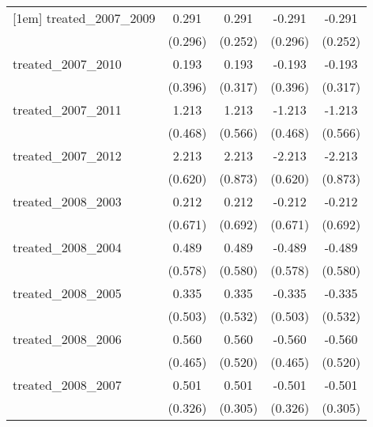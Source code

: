 {\begin{tabular}{l*{4}{c}}
[1em]
treated\_2007\_2009&       0.291         &       0.291         &      -0.291         &      -0.291         \\
            &     (0.296)         &     (0.252)         &     (0.296)         &     (0.252)         \\
[1em]
treated\_2007\_2010&       0.193         &       0.193         &      -0.193         &      -0.193         \\
            &     (0.396)         &     (0.317)         &     (0.396)         &     (0.317)         \\
[1em]
treated\_2007\_2011&       1.213\sym{**} &       1.213\sym{*}  &      -1.213\sym{**} &      -1.213\sym{*}  \\
            &     (0.468)         &     (0.566)         &     (0.468)         &     (0.566)         \\
[1em]
treated\_2007\_2012&       2.213\sym{***}&       2.213\sym{*}  &      -2.213\sym{***}&      -2.213\sym{*}  \\
            &     (0.620)         &     (0.873)         &     (0.620)         &     (0.873)         \\
[1em]
treated\_2008\_2003&       0.212         &       0.212         &      -0.212         &      -0.212         \\
            &     (0.671)         &     (0.692)         &     (0.671)         &     (0.692)         \\
[1em]
treated\_2008\_2004&       0.489         &       0.489         &      -0.489         &      -0.489         \\
            &     (0.578)         &     (0.580)         &     (0.578)         &     (0.580)         \\
[1em]
treated\_2008\_2005&       0.335         &       0.335         &      -0.335         &      -0.335         \\
            &     (0.503)         &     (0.532)         &     (0.503)         &     (0.532)         \\
[1em]
treated\_2008\_2006&       0.560         &       0.560         &      -0.560         &      -0.560         \\
            &     (0.465)         &     (0.520)         &     (0.465)         &     (0.520)         \\
[1em]
treated\_2008\_2007&       0.501         &       0.501         &      -0.501         &      -0.501         \\
            &     (0.326)         &     (0.305)         &     (0.326)         &     (0.305)         \\

\end{tabular}}
